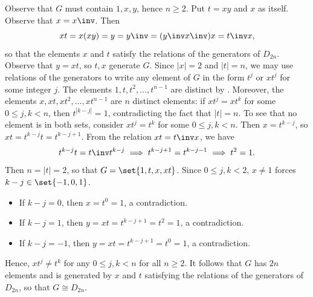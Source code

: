 \begin{sol}
    Observe that $G$ must contain $1, x, y$, hence $n \geq 2$.
    Put $t = xy$ and $x$ as itself.
    Observe that $x = x\inv$.
    Then
    \[
        xt = x(xy) = y = y\inv = (y\inv x\inv)x = t\inv x,
    \]
    so that the elements $x$ and $t$ satisfy the relations of the generators of $D_{2n}$.
    Observe that $y = xt$, so $t, x$ generate $G$.
    Since $|x| = 2$ and $|t| = n$, we may use relations of the generators to write any element of $G$ in the form $t^j$ or $xt^j$ for some integer $j$.
    The elements $1, t, t^2, \ldots, t^{n-1}$ are distinct by .
    Moreover, the elements $x, xt, xt^2, \ldots, xt^{n-1}$ are $n$ distinct elements: if $xt^j = xt^k$ for some $0 \leq j, k < n$, then $t^{|k - j|} = 1$, contradicting the fact that $|t| = n$.
    To see that no element is in both sets, consider $x t^j = t^k$ for some $0 \leq j, k < n$.
    Then $x = t^{k - j}$, so $x t = t^{k - j} t = t^{k - j + 1}$.
    From the relation $xt = t\inv x$, we have
    \[
        t^{k - j}t = t\inv t^{k - j} \implies t^{k - j + 1} = t^{k - j - 1} \implies t^2 = 1.
    \]
    Then $n = |t| = 2$, so that $G = \set{1, t, x, xt}$.
    Since $0 \leq j, k < 2$, $x \neq 1$ forces $k - j \in \set{-1, 0, 1}$.
    \begin{itemize}
        \item If $k - j = 0$, then $x = t^0 = 1$, a contradiction.
        \item If $k - j = 1$, then $y = x t = t^{k - j + 1} = t^2 = 1$, a contradiction.
        \item If $k - j = -1$, then $y = x t = t^{k - j + 1} = t^0 = 1$, a contradiction.
    \end{itemize}
    Hence, $x t^j \neq t^k$ for any $0 \leq j, k < n$ for all $n \geq 2$.
    It follows that $G$ has $2n$ elements and is generated by $x$ and $t$ satisfying the relations of the generators of $D_{2n}$, so that $G \cong D_{2n}$.
\end{sol}

